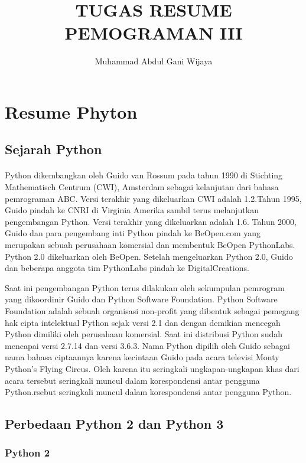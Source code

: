 \documentclass{article}
\title{TUGAS RESUME PEMOGRAMAN III}
\author{Muhammad Abdul Gani Wijaya }
\begin{document}
\maketitle

\section{Resume Phyton}
\subsection{Sejarah Python}
\paragraph{}
Python dikembangkan oleh Guido van Rossum pada tahun 1990 di Stichting Mathematisch Centrum (CWI), Amsterdam sebagai kelanjutan dari bahasa pemrograman ABC. Versi terakhir yang dikeluarkan CWI adalah 1.2.Tahun 1995, Guido pindah ke CNRI di Virginia Amerika sambil terus melanjutkan pengembangan Python. Versi terakhir yang dikeluarkan adalah 1.6. Tahun 2000, Guido dan para pengembang inti Python pindah ke BeOpen.com yang merupakan sebuah perusahaan komersial dan membentuk BeOpen PythonLabs. Python 2.0 dikeluarkan oleh BeOpen. Setelah mengeluarkan Python 2.0, Guido dan beberapa anggota tim PythonLabs pindah ke DigitalCreations.

Saat ini pengembangan Python terus dilakukan oleh sekumpulan pemrogram yang dikoordinir Guido dan Python Software Foundation. Python Software Foundation adalah sebuah organisasi non-profit yang dibentuk sebagai pemegang hak cipta intelektual Python sejak versi 2.1 dan dengan demikian mencegah Python dimiliki oleh perusahaan komersial. Saat ini distribusi Python sudah mencapai versi 2.7.14 dan versi 3.6.3. Nama Python dipilih oleh Guido sebagai nama bahasa ciptaannya karena kecintaan Guido pada acara televisi Monty Python's Flying Circus. Oleh karena itu seringkali ungkapan-ungkapan khas dari acara tersebut seringkali muncul dalam korespondensi antar pengguna Python.rsebut seringkali muncul dalam korespondensi antar pengguna Python.

\subsection{Perbedaan Python 2 dan Python 3}
\subsubsection{Python 2}
\end{document}
